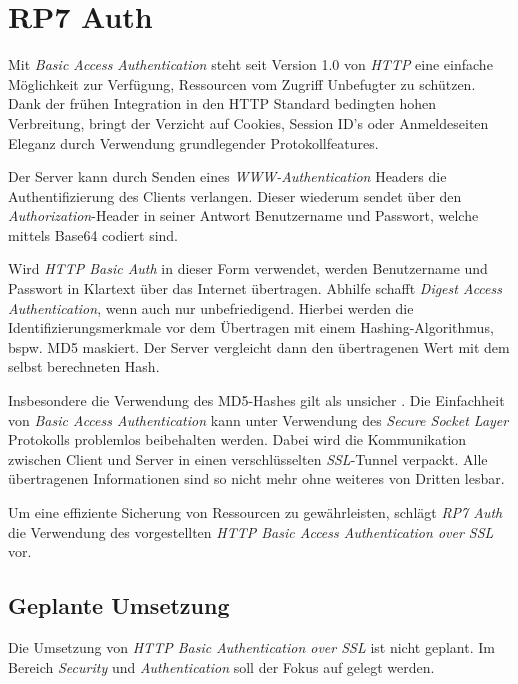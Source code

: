 \section{RP7 Auth}
\label{sec:principle-rp7-auth}


Mit \emph{Basic Access Authentication} \cite{HTTPBasicAuth} steht seit Version 1.0 von \emph{HTTP} eine einfache Möglichkeit zur Verfügung, Ressourcen vom Zugriff Unbefugter zu schützen. Dank der frühen Integration in den HTTP Standard bedingten hohen Verbreitung, bringt der Verzicht auf Cookies, Session ID's oder Anmeldeseiten Eleganz durch Verwendung grundlegender Protokollfeatures.

Der Server kann durch Senden eines \emph{WWW-Authentication} Headers die Authentifizierung des Clients verlangen. Dieser wiederum sendet über den \emph{Authorization}-Header in seiner Antwort Benutzername und Passwort, welche mittels Base64 \cite{Base64} codiert sind.

Wird \emph{HTTP Basic Auth} in dieser Form verwendet, werden Benutzername und Passwort in Klartext über das Internet übertragen. Abhilfe schafft \emph{Digest Access Authentication}, wenn auch nur unbefriedigend. Hierbei werden die Identifizierungsmerkmale vor dem Übertragen mit einem Hashing-Algorithmus, bspw. MD5 maskiert. Der Server vergleicht dann den übertragenen Wert mit dem selbst berechneten Hash.

Insbesondere die Verwendung des MD5-Hashes gilt als unsicher \cite{MD5Broken}. Die Einfachheit von \emph{Basic Access Authentication} kann unter Verwendung des \emph{Secure Socket Layer} Protokolls \cite{SSL} problemlos beibehalten werden. Dabei wird die Kommunikation zwischen Client und Server in einen verschlüsselten \emph{\gls{SSL}}-Tunnel verpackt. Alle übertragenen Informationen sind so nicht mehr ohne weiteres von Dritten lesbar.

Um eine effiziente Sicherung von Ressourcen zu gewährleisten, schlägt \emph{RP7 Auth} die Verwendung des vorgestellten \emph{HTTP Basic Access Authentication over SSL} vor.


\subsection*{Geplante Umsetzung}

Die Umsetzung von \emph{HTTP Basic Authentication over SSL} ist nicht geplant. Im Bereich \emph{Security} und \emph{Authentication} soll der Fokus auf  gelegt werden.

